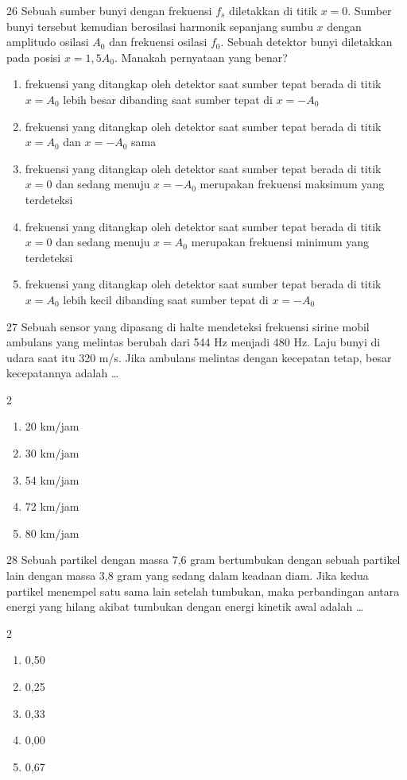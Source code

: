 \documentclass[11pt]{article}
\newenvironment{pil}{%
  \begin{enumerate}[label=(\Alph*),leftmargin=*,itemsep=1pt,topsep=3pt]}%
  {\end{enumerate}}
\newenvironment{pilB}{%
  \par\smallskip\begin{multicols}{2}
  \begin{enumerate}[label=(\Alph*),leftmargin=*,itemsep=1pt,topsep=3pt]}%
  {\end{enumerate}\end{multicols}}
\begin{document}
\begin{soal}{26}
Sebuah sumber bunyi dengan frekuensi $f_s$ diletakkan di titik $x=0$.
Sumber bunyi tersebut kemudian berosilasi harmonik sepanjang sumbu $x$
dengan amplitudo osilasi $A_0$ dan frekuensi osilasi $f_0$. Sebuah
detektor bunyi diletakkan pada posisi $x=1{,}5A_0$. Manakah pernyataan
yang benar?
\begin{pil}
  \item frekuensi yang ditangkap oleh detektor saat sumber tepat berada di
        titik $x=A_0$ lebih besar dibanding saat sumber tepat di $x=-A_0$
  \item frekuensi yang ditangkap oleh detektor saat sumber tepat berada di
        titik $x=A_0$ dan $x=-A_0$ sama
  \item frekuensi yang ditangkap oleh detektor saat sumber tepat berada di
        titik $x=0$ dan sedang menuju $x=-A_0$ merupakan frekuensi maksimum
        yang terdeteksi
  \item frekuensi yang ditangkap oleh detektor saat sumber tepat berada di
        titik $x=0$ dan sedang menuju $x=A_0$ merupakan frekuensi minimum
        yang terdeteksi
  \item frekuensi yang ditangkap oleh detektor saat sumber tepat berada di
        titik $x=A_0$ lebih kecil dibanding saat sumber tepat di $x=-A_0$
\end{pil}
\end{soal}

\begin{soal}{27}
Sebuah sensor yang dipasang di halte mendeteksi frekuensi sirine mobil
ambulans yang melintas berubah dari 544 Hz menjadi 480 Hz. Laju bunyi
di udara saat itu 320 m/s. Jika ambulans melintas dengan kecepatan tetap,
besar kecepatannya adalah \ldots
\begin{pilB}
  \item 20 km/jam \item 30 km/jam \item 54 km/jam \item 72 km/jam \item 80 km/jam
\end{pilB}
\end{soal}

\begin{soal}{28}
Sebuah partikel dengan massa 7,6 gram bertumbukan dengan sebuah partikel
lain dengan massa 3,8 gram yang sedang dalam keadaan diam. Jika kedua
partikel menempel satu sama lain setelah tumbukan, maka perbandingan
antara energi yang hilang akibat tumbukan dengan energi kinetik awal
adalah \ldots
\begin{pilB}
  \item 0,50 \item 0,25 \item 0,33 \item 0,00 \item 0,67
\end{pilB}
\end{soal}
\end{document}

